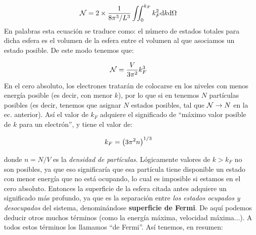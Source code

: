 \begin{equation}
	\mathcal{N} = 2 \times \frac{1}{8\pi^3/L^3} \iint_0^{k_F} k_F^2 \mathrm{d} k \mathrm{d} \Omega
\end{equation}
En palabras esta ecuación se traduce como: el número de estados totales para dicha esfera es el volumen de la esfera entre el volumen al que asociamos un estado posible. De este modo tenemos que:

\begin{equation}
	\mathcal{N} = \frac{V}{3\pi^2} k_F^3
\end{equation}
En el cero absoluto, los electrones tratarán de colocarse en los niveles con menos energía posible (es decir, con menor $k$), por lo que si en tenemos $N$ partículas posibles (es decir, tenemos que asignar $N$ estados posibles, tal que $\mathcal{N} \rightarrow N$ en la ec. anterior). Así el valor de $k_F$ adquiere el significado de ``máximo valor posible de $k$ para un electrón'', y tiene el valor de:

\begin{mybox}
\begin{equation}
	k_F =  \left( 3\pi^2 n \right)^{1/3}
\end{equation}
\end{mybox}
donde $n=N/V$ es la \textit{densidad de partículas}. Lógicamente valores de $k>k_F$ no son posibles, ya que eso significaría que esa partícula tiene disponible un estado con menor energía que no está ocupando, lo cual es imposible si estamos en el cero absoluto. Entonces la superficie de la esfera citada antes adquiere un significado más profundo, ya que es la separación entre \textit{los estados ocupados y desocupados} del sistema, denominándose \textbf{superficie de Fermi}. De aquí podemos deducir otros muchos términos (como la energía máxima, velocidad máxima...). A todos estos términos los llamamos ``de Fermi''. Así tenemos, en resumen:

